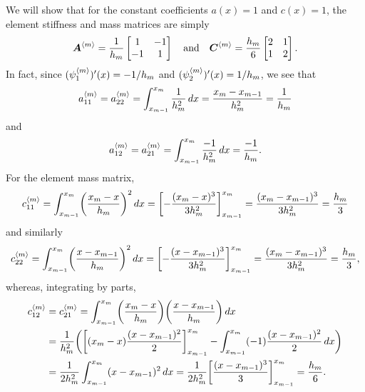 \begin{example}
We will show that for the constant coefficients $a(x)=1$ and $c(x)=1$, the 
element stiffness and mass matrices are simply
\[
\boldsymbol{A}^{\langle m\rangle}=\frac{1}{h_m}\begin{bmatrix}1&-1\\ -1&1\end{bmatrix}
\quad\text{and}\quad
\boldsymbol{C}^{\langle m\rangle}=\frac{h_m}{6}\begin{bmatrix}2&1\\ 1&2\end{bmatrix}.
\]
In fact, since $(\psi^{\langle m\rangle}_1)'(x)=-1/h_m$ and 
$(\psi^{\langle m\rangle}_2)'(x)=1/h_m$, we see that
\[
a^{\langle m\rangle}_{11}=a^{\langle m\rangle}_{22}
	=\int_{x_{m-1}}^{x_m}\frac{1}{h_m^2}\,dx
	=\frac{x_m-x_{m-1}}{h_m^2}=\frac{1}{h_m}
\]
and
\[
a^{\langle m\rangle}_{12}=a^{\langle m\rangle}_{21}
	=\int_{x_{m-1}}^{x_m}\frac{-1}{h_m^2}\,dx=\frac{-1}{h_m}.
\]
For the element mass matrix,
\[
c^{\langle m\rangle}_{11}=\int_{x_{m-1}}^{x_m}\biggl(\frac{x_m-x}{h_m}\biggr)^2\,dx
	=\biggl[-\frac{(x_m-x)^3}{3h_m^2}\biggr]_{x_{m-1}}^{x_m}
	=\frac{(x_m-x_{m-1})^3}{3h_m^2}=\frac{h_m}{3}
\]
and similarly
\[
c^{\langle m\rangle}_{22}=\int_{x_{m-1}}^{x_m}\biggl(\frac{x-x_{m-1}}{h_m}\biggr)^2\,dx
	=\biggl[-\frac{(x-x_{m-1})^3}{3h_m^2}\biggr]_{x_{m-1}}^{x_m}
	=\frac{(x_m-x_{m-1})^3}{3h_m^2}=\frac{h_m}{3},
\]
whereas, integrating by parts,
\begin{align*}
c^{\langle m\rangle}_{12}&=c^{\langle m\rangle}_{21}=\int_{x_{m-1}}^{x_m}
	\biggl(\frac{x_m-x}{h_m}\biggr)\biggl(\frac{x-x_{m-1}}{h_m}\biggr)\,dx\\
	&=\frac{1}{h_m^2}\biggl(
	\biggl[(x_m-x)\frac{(x-x_{m-1})^2}{2}\biggr]_{x_{m-1}}^{x_m}
	-\int_{x_{m-1}}^{x_m}(-1)\frac{(x-x_{m-1})^2}{2}\,dx\biggr)\\
	&=\frac{1}{2h_m^2}\int_{x_{m-1}}^{x_m}(x-x_{m-1})^2\,dx
	=\frac{1}{2h_m^2}\biggl[\frac{(x-x_{m-1})^3}{3}\biggr]_{x_{m-1}}^{x_m}
	=\frac{h_m}{6}.
\end{align*}
\end{example}


